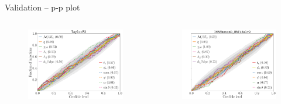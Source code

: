 \documentclass[usenames,dvipsnames,t]{beamer}
\begin{document}
\begin{frame}{Validation -- p-p plot}
  \begin{columns}
    \begin{figure}
      \centering
      \includegraphics[width=\linewidth]{Figures/pp_plot_TF2.pdf}
    \end{figure}
    \begin{figure}
      \centering
      \includegraphics[width=\linewidth]{Figures/pp_plot_NRTv2.pdf}
    \end{figure}
  \end{columns}
\end{frame}
\end{document}
